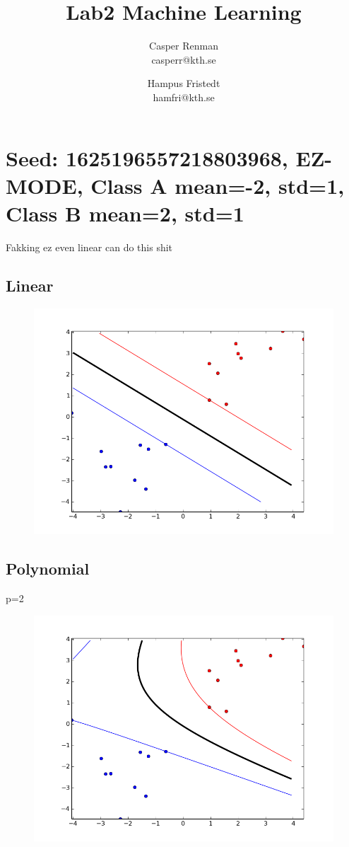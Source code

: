 \documentclass{article}
\title{Lab2 Machine Learning}
\author{Casper Renman\\casperr@kth.se \and Hampus Fristedt\\hamfri@kth.se}
\begin{document}
\maketitle

\section{Seed: 1625196557218803968, EZ-MODE, Class A mean=-2, std=1, Class B mean=2, std=1}
Fakking ez even linear can do this shit
\subsection{Linear}
\begin{figure}[H]
    \centering
    \includegraphics[width=1.0\linewidth]{../img/linear_s1_ez.png}
\end{figure}

\subsection{Polynomial}
p=2
\begin{figure}[H]
    \centering
    \includegraphics[width=1.0\linewidth]{../img/poly_s1_ez_p2.png}
\end{figure}
\end{document}
